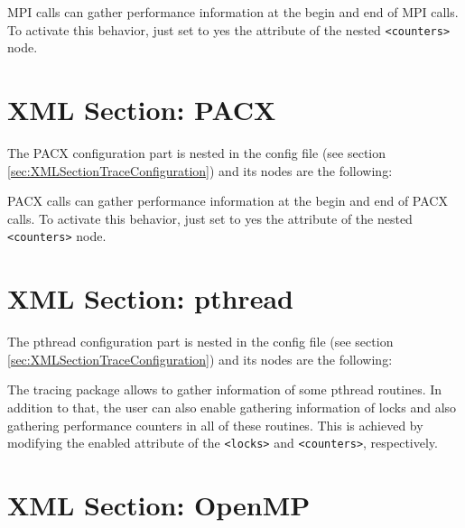 

MPI calls can gather performance information at the begin and end of MPI calls. To activate this behavior, just set to yes the attribute of the nested {\tt <counters>} node.


\section{XML Section: PACX}\label{sec:XMLSectionPACX}

The PACX configuration part is nested in the config file (see section \ref{sec:XMLSectionTraceConfiguration}) and its nodes are the following:



PACX calls can gather performance information at the begin and end of PACX calls. To activate this behavior, just set to yes the attribute of the nested {\tt <counters>} node.


\section{XML Section: pthread}\label{sec:XMLSectionOpenMP}

The pthread configuration part is nested in the config file (see section \ref{sec:XMLSectionTraceConfiguration}) and its nodes are the following:



The tracing package allows to gather information of some pthread routines. In addition to that, the user can also enable gathering information of locks and also gathering performance counters in all of these routines. This is achieved by modifying the enabled attribute of the {\tt <locks>} and {\tt <counters>}, respectively.


\section{XML Section: OpenMP}\label{sec:XMLSectionOpenMP}

